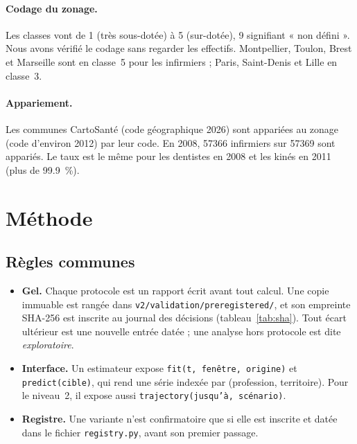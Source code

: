 \documentclass[11pt]{article}
\begin{document}
\paragraph{Codage du zonage.} Les classes vont de 1 (très sous-dotée) à 5 (sur-dotée), 9 signifiant
« non défini ». Nous avons vérifié le codage sans regarder les effectifs. Montpellier, Toulon, Brest
et Marseille sont en classe~5 pour les infirmiers ; Paris, Saint-Denis et Lille en classe~3.

\paragraph{Appariement.} Les communes CartoSanté (code géographique 2026) sont appariées au zonage
(code d'environ 2012) par leur code. En 2008, \num{57366}\mesure{} infirmiers sur
\num{57369}\mesure{} sont appariés. Le taux est le même pour les dentistes en 2008 et les kinés en
2011 (plus de \num{99.9}\derive{}~\%).

\section{Méthode}\label{sec:methode}
\subsection{Règles communes}
\begin{itemize}
  \item \textbf{Gel.} Chaque protocole est un rapport écrit avant tout calcul. Une copie immuable est
        rangée dans \texttt{v2/validation/preregistered/}, et son empreinte SHA-256 est inscrite au
        journal des décisions (tableau~\ref{tab:sha}). Tout écart ultérieur est une nouvelle entrée
        datée ; une analyse hors protocole est dite \emph{exploratoire}.
  \item \textbf{Interface.} Un estimateur expose \texttt{fit(t, fenêtre, origine)} et
        \texttt{predict(cible)}, qui rend une série indexée par (profession, territoire). Pour le
        niveau~2, il expose aussi \texttt{trajectory(jusqu'à, scénario)}.
  \item \textbf{Registre.} Une variante n'est confirmatoire que si elle est inscrite et datée
        dans le fichier \texttt{registry.py}, avant son premier passage.
\end{itemize}
\end{document}
